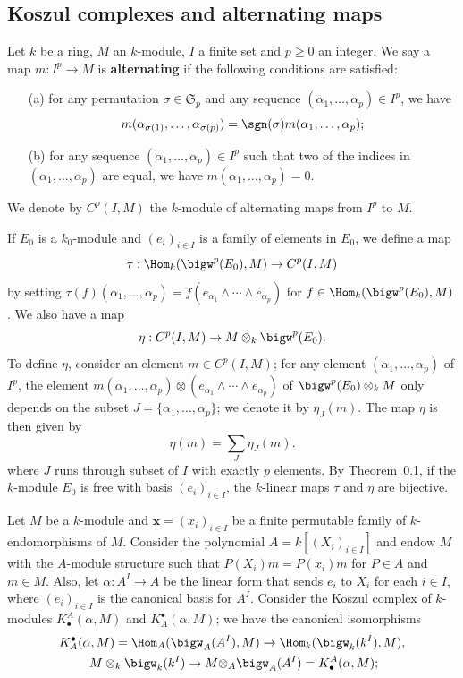 \subsection{Koszul complexes and alternating maps}
Let $k$ be a ring, $M$ an $k$-module, $I$ a finite set and $p\geq 0$ an integer. We say a map $m:I^p\to M$ is \textbf{alternating} if the following conditions are satisfied:
\begin{enumerate}
\item[(a)] for any permutation $\sigma\in\mathfrak{S}_p$ and any sequence $(\alpha_1,\dots,\alpha_p)\in I^p$, we have
\[m(\alpha_{\sigma(1)},\dots,\alpha_{\sigma(p)})=\sgn(\sigma)m(\alpha_1,\dots,\alpha_p);\] 
\item[(b)] for any sequence $(\alpha_1,\dots,\alpha_p)\in I^p$ such that two of the indices in $(\alpha_1,\dots,\alpha_p)$ are equal, we have $m(\alpha_1,\dots,\alpha_p)=0$.
\end{enumerate}
We denote by $C^p(I,M)$ the $k$-module of alternating maps from $I^p$ to $M$.\par
If $E_0$ is a $k_0$-module and $(e_i)_{i\in I}$ is a family of elements in $E_0$, we define a map
\[\tau:\Hom_k(\bigw^p(E_0),M)\to C^p(I,M)\]
by setting $\tau(f)(\alpha_1,\dots,\alpha_p)=f(e_{\alpha_1}\wedge\cdots\wedge e_{\alpha_p})$ for $f\in\Hom_k(\bigw^p(E_0),M)$. We also have a map
\[\eta:C^p(I,M)\to M\otimes_k\bigw^p(E_0).\]
To define $\eta$, consider an element $m\in C^p(I,M)$; for any element $(\alpha_1,\dots,\alpha_p)$ of $I^p$, the element $m(\alpha_1,\dots,\alpha_p)\otimes(e_{\alpha_1}\wedge\cdots\wedge e_{\alpha_p})$ of $\bigw^p(E_0)\otimes_kM$ only depends on the subset $J=\{\alpha_1,\dots,\alpha_p\}$; we denote it by $\eta_J(m)$. The map $\eta$ is then given by
\[\eta(m)=\sum_{J}\eta_J(m).\]
where $J$ runs through subset of $I$ with exactly $p$ elements. By Theorem~\ref{}, if the $k$-module $E_0$ is free with basis $(e_i)_{i\in I}$, the $k$-linear maps $\tau$ and $\eta$ are bijective.\par
Let $M$ be a $k$-module and $\bm{x}=(x_i)_{i\in I}$ be a finite permutable family of $k$-endomorphisms of $M$. Consider the polynomial $A=k[(X_i)_{i\in I}]$ and endow $M$ with the $A$-module structure such that $P(X_i)m=P(x_i)m$ for $P\in A$ and $m\in M$. Also, let $\alpha:A^I\to A$ be the linear form that sends $e_i$ to $X_i$ for each $i\in I$, where $(e_i)_{i\in I}$ is the canonical basis for $A^I$. Consider the Koszul complex of $k$-modules $K_\bullet^A(\alpha,M)$ and $K^\bullet_A(\alpha,M)$; we have the canonical isomorphisms
\begin{align*}
K_A^\bullet(\alpha,M)=\Hom_A(\bigw_A(A^I)&,M)\to\Hom_k(\bigw_k(k^I),M),\\
M\otimes_k\bigw_k(k^I)\to M\otimes_A&\bigw_A(A^I)=K^A_\bullet(\alpha,M);
\end{align*}
